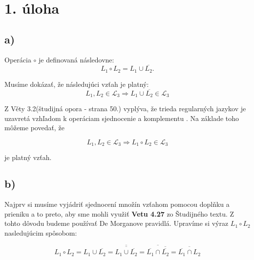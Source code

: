 \documentclass[11pt,a4paper]{article}
\begin{document}
\setlength{\parskip}{0pt}
    \hypersetup{hidelinks}\tableofcontents
\setlength{\parskip}{0pt}

\newpage

\section{1. úloha}
\subsection{a)}

Operácia $\circ$ je definovaná následovne:
\begin{equation}
L_1 \circ L_2 = L_1 \cup \overline{L_2}.
\end{equation}


Musíme dokázať, že následujúci vzťah je platný:
\begin{equation}
L_1, L_2 \in \mathcal{L}_3 \Rightarrow L_1 \cup \overline{L_2} \in \mathcal{L}_3
\end{equation}

Z Věty 3.2(študijná opora - strana 50.) vyplýva, že trieda regularných jazykov je uzavretá vzhľadom k operáciam sjednocenie a komplementu \cite{AA}. Na základe toho môžeme povedať, že

\begin{equation}
L_1, L_2 \in \mathcal{L}_3 \Rightarrow L_1 \circ L_2 \in \mathcal{L}_3
\end{equation}

je platný vzťah.










\subsection{b)}

Najprv si musíme vyjádriť sjednocení množín vzťahom pomocou doplňku a prieniku a to preto, aby sme mohli využiť \textbf{Vetu 4.27} zo Študijného textu. Z tohto dôvodu budeme používať De Morganove pravidlá. Upravíme si
výraz $L_1 \circ L_2$ nasledujúcim spôsobom:

\begin{equation}
L_1 \circ L_2 = L_1 \cup \overline{L_2} = \overline{\overline{L_1 \cup \overline{L_2}}} = \overline{\overline{L_1} \cap \overline{\overline{L_2}}} = \overline{\overline{L_1} \cap L_2}
\end{equation}
\end{document}
